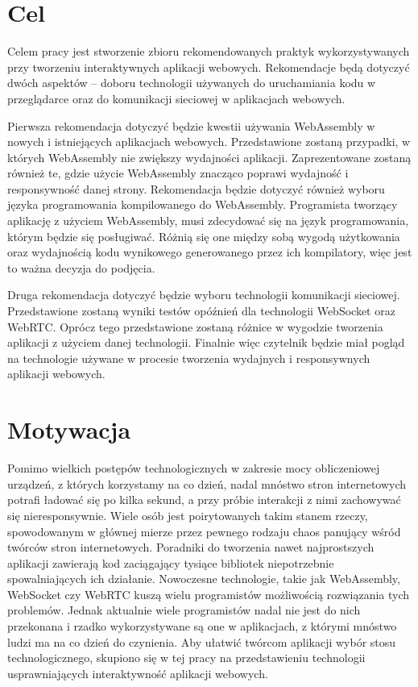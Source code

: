 \documentclass[language=polish,type=master]{aghmodern}
\begin{document}
\pagebreak

\section{Cel}
Celem pracy jest stworzenie zbioru rekomendowanych praktyk wykorzystywanych przy tworzeniu interaktywnych aplikacji webowych.
Rekomendacje będą dotyczyć dwóch aspektów -- doboru technologii używanych do uruchamiania kodu w przeglądarce oraz do komunikacji sieciowej w aplikacjach webowych.

Pierwsza rekomendacja dotyczyć będzie kwestii używania WebAssembly w nowych i istniejących aplikacjach webowych.
Przedstawione zostaną przypadki, w których WebAssembly nie zwiększy wydajności aplikacji.
Zaprezentowane zostaną również te, gdzie użycie WebAssembly znacząco poprawi wydajność i responsywność danej strony.
Rekomendacja będzie dotyczyć również wyboru języka programowania kompilowanego do WebAssembly.
Programista tworzący aplikację z użyciem WebAssembly, musi zdecydować się na język programowania, którym będzie się posługiwać.
Różnią się one między sobą wygodą użytkowania oraz wydajnością kodu wynikowego generowanego przez ich kompilatory, więc jest to ważna decyzja do podjęcia.

Druga rekomendacja dotyczyć będzie wyboru technologii komunikacji sieciowej.
Przedstawione zostaną wyniki testów opóźnień dla technologii WebSocket oraz WebRTC.
Oprócz tego przedstawione zostaną różnice w wygodzie tworzenia aplikacji z użyciem danej technologii.
Finalnie więc czytelnik będzie miał pogląd na technologie używane w procesie tworzenia wydajnych i responsywnych aplikacji webowych.

\section{Motywacja}
Pomimo wielkich postępów technologicznych w zakresie mocy obliczeniowej urządzeń, z których korzystamy na co dzień, nadal mnóstwo stron internetowych potrafi ładować się po kilka sekund, a przy próbie interakcji z nimi zachowywać się nieresponsywnie.
Wiele osób jest poirytowanych takim stanem rzeczy, spowodowanym w głównej mierze przez pewnego rodzaju chaos panujący wśród twórców stron internetowych.
Poradniki do tworzenia nawet najprostszych aplikacji zawierają kod zaciągający tysiące bibliotek niepotrzebnie spowalniających ich działanie.
Nowoczesne technologie, takie jak WebAssembly, WebSocket czy WebRTC kuszą wielu programistów możliwością rozwiązania tych problemów.
Jednak aktualnie wiele programistów nadal nie jest do nich przekonana i rzadko wykorzystywane są one w aplikacjach, z którymi mnóstwo ludzi ma na co dzień do czynienia.
Aby ułatwić twórcom aplikacji wybór stosu technologicznego, skupiono się w tej pracy na przedstawieniu technologii usprawniających interaktywność aplikacji webowych.
\end{document}

